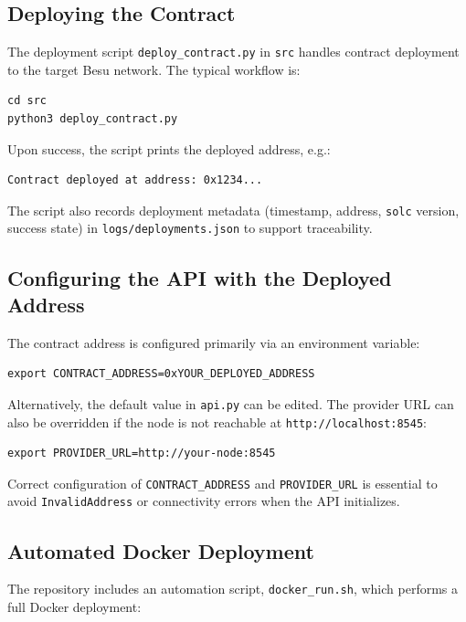 \documentclass[11pt,a4paper]{article}
\begin{document}
\subsection{Deploying the Contract}

The deployment script \texttt{deploy\_contract.py} in \texttt{src} handles contract deployment to the target Besu network. The typical workflow is:

\begin{lstlisting}
cd src
python3 deploy_contract.py
\end{lstlisting}

Upon success, the script prints the deployed address, e.g.:

\begin{lstlisting}
Contract deployed at address: 0x1234...
\end{lstlisting}

The script also records deployment metadata (timestamp, address, \texttt{solc} version, success state) in \texttt{logs/deployments.json} to support traceability.

\subsection{Configuring the API with the Deployed Address}

The contract address is configured primarily via an environment variable:

\begin{lstlisting}
export CONTRACT_ADDRESS=0xYOUR_DEPLOYED_ADDRESS
\end{lstlisting}

Alternatively, the default value in \texttt{api.py} can be edited. The provider URL can also be overridden if the node is not reachable at \texttt{http://localhost:8545}:

\begin{lstlisting}
export PROVIDER_URL=http://your-node:8545
\end{lstlisting}

Correct configuration of \texttt{CONTRACT\_ADDRESS} and \texttt{PROVIDER\_URL} is essential to avoid \texttt{InvalidAddress} or connectivity errors when the API initializes.

\subsection{Automated Docker Deployment}

The repository includes an automation script, \texttt{docker\_run.sh}, which performs a full Docker deployment:
\end{document}
